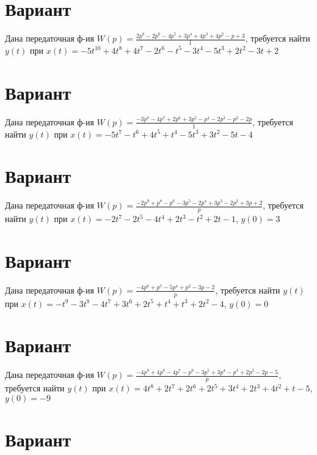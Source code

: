 \documentclass{article}
\begin{document}
\section{Вариант}

Дана передаточная ф-ия $W(p)=\frac{2p^{8}-2p^{6}-4p^{5}+3p^{4}+4p^{3}+4p^{2}-p+3}{1}$, требуется найти $y(t)$ при $x(t)=-5t^{10}+4t^{8}+4t^{7}-2t^{6}-t^{5}-3t^{4}-5t^{3}+2t^{2}-3t+2$



\section{Вариант}

Дана передаточная ф-ия $W(p)=\frac{-3p^{8}-4p^{7}+2p^{6}+3p^{5}-p^{4}-2p^{3}-p^{2}-2p}{1}$, требуется найти $y(t)$ при $x(t)=-5t^{7}-t^{6}+4t^{5}+t^{4}-5t^{3}+3t^{2}-5t-4$



\section{Вариант}

Дана передаточная ф-ия $W(p)=\frac{-2p^{9}+p^{8}-p^{6}-3p^{5}-2p^{4}+3p^{3}-2p^{2}+3p+2}{p}$, требуется найти $y(t)$ при $x(t)=-2t^{7}-2t^{5}-4t^{4}+2t^{3}-t^{2}+2t-1$, $y(0)=3$



\section{Вариант}

Дана передаточная ф-ия $W(p)=\frac{-4p^{6}+p^{5}-5p^{4}+p^{2}-3p-2}{p}$, требуется найти $y(t)$ при $x(t)=-t^{9}-3t^{8}-4t^{7}+3t^{6}+2t^{5}+t^{4}+t^{3}+2t^{2}-4$, $y(0)=0$



\section{Вариант}

Дана передаточная ф-ия $W(p)=\frac{-4p^{9}+4p^{8}-4p^{7}-p^{6}-3p^{5}+3p^{4}-p^{3}+2p^{2}-2p-5}{p}$, требуется найти $y(t)$ при $x(t)=4t^{8}+2t^{7}+2t^{6}+2t^{5}+3t^{4}+2t^{3}+4t^{2}+t-5$, $y(0)=-9$



\section{Вариант}
\end{document}
